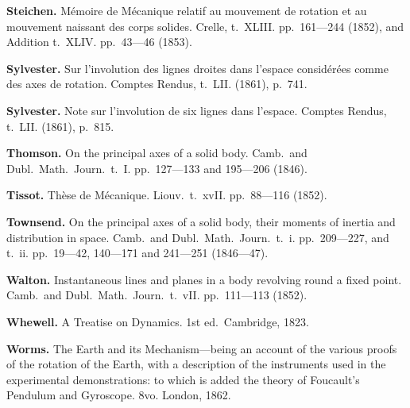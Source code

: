\documentclass[12pt,a4paper]{article}
\theoremstyle{definition}
\begin{document}
\vspace{0.5em}

\noindent\textbf{Steichen.} M\'{e}moire de M\'{e}canique relatif au mouvement de rotation et au mouvement naissant des corps solides. Crelle, t.~XLIII. pp.~161---244 (1852), and Addition t.~XLIV. pp.~43---46 (1853).

\vspace{0.5em}

\noindent\textbf{Sylvester.} Sur l'involution des lignes droites dans l'espace consid\'{e}r\'{e}es comme des axes de rotation. Comptes Rendus, t.~LII. (1861), p.~741.

\vspace{0.5em}

\noindent\textbf{Sylvester.} Note sur l'involution de six lignes dans l'espace. Comptes Rendus, t.~LII. (1861), p.~815.

\vspace{0.5em}

\noindent\textbf{Thomson.} On the principal axes of a solid body. Camb.~and Dubl.~Math.~Journ.~t.~I. pp.~127---133 and 195---206 (1846).

\vspace{0.5em}

\noindent\textbf{Tissot.} Th\`{e}se de M\'{e}canique. Liouv.~t.~xvII. pp.~88---116 (1852).

\vspace{0.5em}

\noindent\textbf{Townsend.} On the principal axes of a solid body, their moments of inertia and distribution in space. Camb.~and Dubl.~Math.~Journ.~t.~i. pp.~209---227, and t.~ii. pp.~19---42, 140---171 and 241---251 (1846---47).

\vspace{0.5em}

\noindent\textbf{Walton.} Instantaneous lines and planes in a body revolving round a fixed point. Camb.~and Dubl.~Math.~Journ.~t.~vII. pp.~111---113 (1852).

\vspace{0.5em}

\noindent\textbf{Whewell.} A Treatise on Dynamics. 1st ed.~Cambridge, 1823.

\vspace{0.5em}

\noindent\textbf{Worms.} The Earth and its Mechanism---being an account of the various proofs of the rotation of the Earth, with a description of the instruments used in the experimental demonstrations: to which is added the theory of Foucault's Pendulum and Gyroscope. 8vo. London, 1862.
\end{document}
